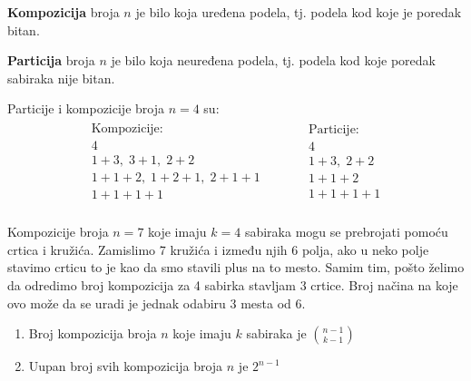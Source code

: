 \begin{definition}
	\textbf{Kompozicija} broja $n$ je bilo koja uređena podela, tj. podela kod koje je poredak bitan.
\end{definition}

\begin{definition}
	\textbf{Particija} broja $n$ je bilo koja neuređena podela, tj. podela kod koje poredak sabiraka nije bitan.
\end{definition}
\begin{example}
	Particije i kompozicije broja $n=4$ su:
	\begin{align*}
		\begin{gathered}
			\text{Kompozicije:}\\
			4\\
			1+3,\;3+1,\;2+2\\
			1+1+2,\;1+2+1,\;2+1+1\\
			1+1+1+1\\
		\end{gathered}
		\quad \quad \quad
		\begin{gathered}
			\text{Particije:}\\
			4\\
			1+3,\;2+2\\
			1+1+2\\
			1+1+1+1\\
		\end{gathered}
	\end{align*}
\end{example}

\begin{example}
	Kompozicije broja $n=7$ koje imaju $k=4$ sabiraka mogu se prebrojati pomoću crtica i kružića. Zamislimo 7 kružića i između njih 6 polja, ako u neko polje stavimo crticu to je kao da smo stavili plus na to mesto. Samim tim, pošto želimo da odredimo broj kompozicija za 4 sabirka stavljam 3 crtice. Broj načina na koje ovo može da se uradi je jednak odabiru 3 mesta od 6.
\end{example}

\begin{theorem}
	\begin{enumerate}
		\item
			Broj kompozicija broja $n$ koje imaju $k$ sabiraka je $\binom{n-1}{k-1}$
		\item
			Uupan broj svih kompozicija broja $n$ je $2^{n-1}$
	\end{enumerate}
\end{theorem}

